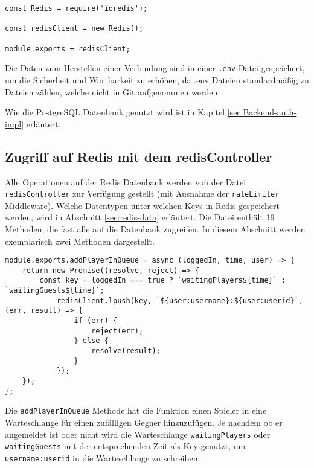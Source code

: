 \begin{lstlisting}[style=codeStyle, caption={Initialisierung einer Redis-Datebank Verbindung}, label={lst:redisClient}]
const Redis = require('ioredis');

const redisClient = new Redis();

module.exports = redisClient;
\end{lstlisting}

Die Daten zum Herstellen einer Verbindung sind in einer \verb|.env| Datei gespeichert, um die Sicherheit und Wartbarkeit zu erhöhen, da .env Dateien standardmäßig zu Dateien zählen, welche nicht in Git aufgenommen werden.

Wie die PostgreSQL Datenbank genutzt wird ist in Kapitel \ref{sec:Backend-auth-impl} erläutert. 

\subsection{Zugriff auf Redis mit dem redisController}
Alle Operationen auf der Redis Datenbank werden von der Datei \verb|redisController| zur Verfügung gestellt (mit Ausnahme der \verb|rateLimiter| Middleware). Welche Datentypen unter welchen Keys in Redis gespeichert werden, wird in Abschnitt \ref{sec:redis-data} erläutert.
Die Datei enthält 19 Methoden, die fast alle auf die Datenbank zugreifen. In diesem Abschnitt werden exemplarisch zwei Methoden dargestellt.

\begin{lstlisting}[style=codeStyle, caption={Methode um einen Spieler in eine Warteschlange hinzuzufügen}, label={lst:addPlayerInQueue}]
module.exports.addPlayerInQueue = async (loggedIn, time, user) => {
    return new Promise((resolve, reject) => {
        const key = loggedIn === true ? `waitingPlayers${time}` : `waitingGuests${time}`;
            redisClient.lpush(key, `${user:username}:${user:userid}`, (err, result) => {
                if (err) {
                    reject(err);
                } else {
                    resolve(result);
                }
            });
    });
};
\end{lstlisting}

Die \verb|addPlayerInQueue| Methode hat die Funktion einen Spieler in eine Warteschlange für einen zufälligen Gegner hinzuzufügen. Je nachdem ob er angemeldet ist oder nicht wird die Warteschlange \verb|waitingPlayers| oder \verb|waitingGuests| mit der entsprechenden Zeit als Key genutzt, um \verb|username:userid| in die Warteschlange zu schreiben.

